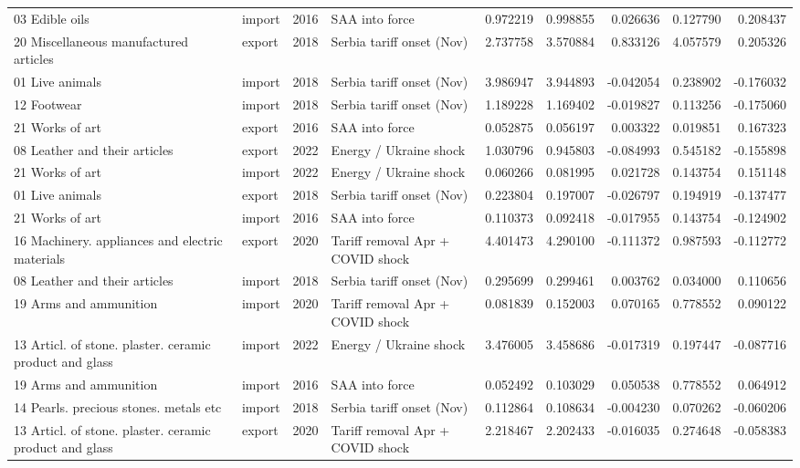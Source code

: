 \begin{tabular}{llrlrrrrr}
03 Edible oils & import & 2016 & SAA into force & 0.972219 & 0.998855 & 0.026636 & 0.127790 & 0.208437 \\
20 Miscellaneous manufactured articles & export & 2018 & Serbia tariff onset (Nov) & 2.737758 & 3.570884 & 0.833126 & 4.057579 & 0.205326 \\
01 Live animals & import & 2018 & Serbia tariff onset (Nov) & 3.986947 & 3.944893 & -0.042054 & 0.238902 & -0.176032 \\
12 Footwear & import & 2018 & Serbia tariff onset (Nov) & 1.189228 & 1.169402 & -0.019827 & 0.113256 & -0.175060 \\
21 Works of art & export & 2016 & SAA into force & 0.052875 & 0.056197 & 0.003322 & 0.019851 & 0.167323 \\
08 Leather and their articles & export & 2022 & Energy / Ukraine shock & 1.030796 & 0.945803 & -0.084993 & 0.545182 & -0.155898 \\
21 Works of art & import & 2022 & Energy / Ukraine shock & 0.060266 & 0.081995 & 0.021728 & 0.143754 & 0.151148 \\
01 Live animals & export & 2018 & Serbia tariff onset (Nov) & 0.223804 & 0.197007 & -0.026797 & 0.194919 & -0.137477 \\
21 Works of art & import & 2016 & SAA into force & 0.110373 & 0.092418 & -0.017955 & 0.143754 & -0.124902 \\
16 Machinery. appliances and electric materials & export & 2020 & Tariff removal Apr + COVID shock & 4.401473 & 4.290100 & -0.111372 & 0.987593 & -0.112772 \\
08 Leather and their articles & import & 2018 & Serbia tariff onset (Nov) & 0.295699 & 0.299461 & 0.003762 & 0.034000 & 0.110656 \\
19 Arms and ammunition & import & 2020 & Tariff removal Apr + COVID shock & 0.081839 & 0.152003 & 0.070165 & 0.778552 & 0.090122 \\
13 Articl. of stone. plaster. ceramic product and glass & import & 2022 & Energy / Ukraine shock & 3.476005 & 3.458686 & -0.017319 & 0.197447 & -0.087716 \\
19 Arms and ammunition & import & 2016 & SAA into force & 0.052492 & 0.103029 & 0.050538 & 0.778552 & 0.064912 \\
14 Pearls. precious stones. metals etc & import & 2018 & Serbia tariff onset (Nov) & 0.112864 & 0.108634 & -0.004230 & 0.070262 & -0.060206 \\
13 Articl. of stone. plaster. ceramic product and glass & export & 2020 & Tariff removal Apr + COVID shock & 2.218467 & 2.202433 & -0.016035 & 0.274648 & -0.058383 \\

\end{tabular}
